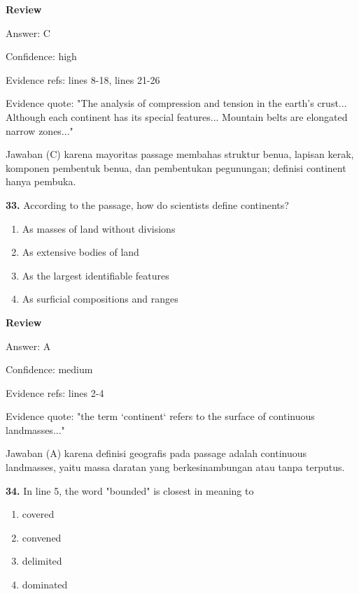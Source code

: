 \documentclass[12pt]{article}
\begin{document}
\par
\begingroup
\setlength{\parskip}{0pt}
\setlength{\parindent}{0pt}
\textbf{Review}\par
Answer: C\par
Confidence: high\par
Evidence refs: lines 8-18, lines 21-26\par
Evidence quote: "The analysis of compression and tension in the earth's crust... Although each continent has its special features... Mountain belts are elongated narrow zones..."\par
Jawaban (C) karena mayoritas passage membahas struktur benua, lapisan kerak, komponen pembentuk benua, dan pembentukan pegunungan; definisi continent hanya pembuka.\par
\endgroup
\par
\vspace{0.25\baselineskip}
\noindent\textbf{33.} According to the passage, how do scientists define continents?
\begin{enumerate}[label=(\Alph*),leftmargin=*,itemsep=0.2em]
\item As masses of land without divisions
\item As extensive bodies of land
\item As the largest identifiable features
\item As surficial compositions and ranges
\end{enumerate}
\par
\begingroup
\setlength{\parskip}{0pt}
\setlength{\parindent}{0pt}
\textbf{Review}\par
Answer: A\par
Confidence: medium\par
Evidence refs: lines 2-4\par
Evidence quote: "the term `continent` refers to the surface of continuous landmasses..."\par
Jawaban (A) karena definisi geografis pada passage adalah continuous landmasses, yaitu massa daratan yang berkesinambungan atau tanpa terputus.\par
\endgroup
\par
\vspace{0.25\baselineskip}
\noindent\textbf{34.} In line 5, the word "bounded" is closest in meaning to
\begin{enumerate}[label=(\Alph*),leftmargin=*,itemsep=0.2em]
\item covered
\item convened
\item delimited
\item dominated
\end{enumerate}
\end{document}
